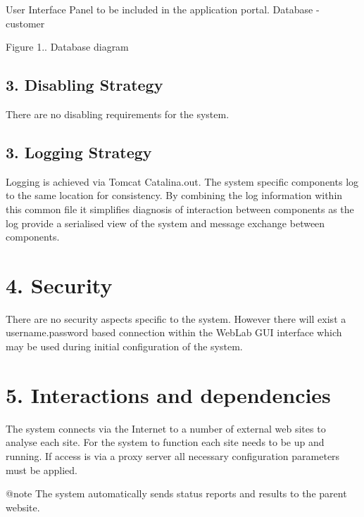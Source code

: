 \begin{DoxyCode}
User Interface Panel to be included in the application portal.
Database - customer
\end{DoxyCode}


 \begin{center} Figure 1.. Database diagram \end{center} \hypertarget{index_sec_3_2}{}\subsection{3.	\+Disabling Strategy}\label{index_sec_3_2}
\begin{DoxyVerb}There are no disabling requirements for the system.
\end{DoxyVerb}
\hypertarget{index_sec_3_3}{}\subsection{3.	\+Logging Strategy}\label{index_sec_3_3}
\begin{DoxyVerb}Logging is achieved via Tomcat Catalina.out.  The system specific components 
log to the same location for consistency.  By combining the log information within 
this common file it simplifies diagnosis of interaction between components as the log
provide a serialised view of the system and message exchange between components.
\end{DoxyVerb}
\hypertarget{index_sec_4}{}\section{4.	\+Security}\label{index_sec_4}
\begin{DoxyVerb}There are no security aspects specific to the system.  However there will exist a username.password 
based connection within the WebLab GUI interface which may be used during initial configuration of
the system.
\end{DoxyVerb}
\hypertarget{index_sec_5}{}\section{5.	\+Interactions and dependencies}\label{index_sec_5}
\begin{DoxyVerb}The system connects via the Internet to a number of external web sites to analyse each site.  For the system to function each site needs to be up and running.  If access is via a proxy server all necessary configuration parameters must be applied.

@note The system automatically sends status reports and results to the parent website.
\end{DoxyVerb}
